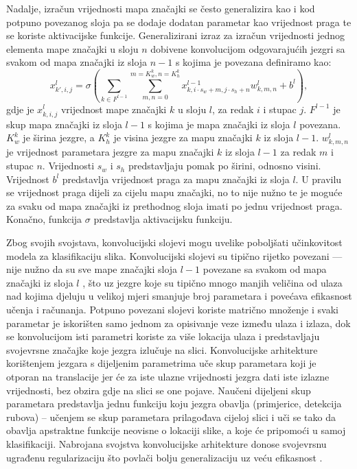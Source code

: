 \documentclass[times, utf8, diplomski, numeric]{fer}
\begin{document}
Nadalje, izračun vrijednosti mapa značajki se često generalizira kao i kod potpuno povezanog sloja pa se dodaje dodatan parametar kao vrijednost praga te se koriste aktivacijske funkcije.
Generalizirani izraz za izračun vrijednosti jednog elementa mape značajki u sloju $n$ dobivene konvolucijom odgovarajućih jezgri sa svakom od mapa značajki iz sloja $n-1$ s kojima je povezana definiramo kao:
\begin{equation}
 x^l_{k',i,j}=\sigma\left(\sum_{k\in F^{l-1}}\sum_{m,n=0}^{m=K_w^k,n=K_h^k}x^{l-1}_{k, i \cdot s_w +m, j \cdot s_h +n} w^l_{k, m, n} + b^l\right), \label{eq:generalized_convolution}
\end{equation}
gdje je $x_{k,i,j}^l$ vrijednost mape značajki $k$ u sloju $l$, za redak $i$ i stupac $j$. 
$F^{l-1}$ je skup mapa značajki iz sloja $l-1$ s kojima je mapa značajki iz sloja $l$ povezana. 
$K_w^k$ je širina jezgre, a $K_h^k$ je visina jezgre za mapu značajki $k$ iz sloja $l-1$. 
$w^l_{k, m, n}$ je vrijednost parametara jezgre za mapu značajki $k$ iz sloja $l-1$ za redak $m$ i stupac $n$.
Vrijednosti $s_w$ i $s_h$ predstavljaju pomak po širini, odnosno visini.
Vrijednost $b^l$ predstavlja vrijednost praga za mapu značajki iz sloja $l$. 
U pravilu se vrijednost praga dijeli za cijelu mapu značajki, no to nije nužno te je moguće za svaku od mapa značajki iz prethodnog sloja imati po jednu vrijednost praga.
Konačno, funkcija $\sigma$ predstavlja aktivacijsku funkciju.

Zbog svojih svojstava, konvolucijski slojevi mogu uvelike poboljšati učinkovitost modela za klasifikaciju slika.
Konvolucijski slojevi su tipično rijetko povezani --- nije nužno da su sve mape značajki sloja $l-1$ povezane sa svakom od mapa značajki iz sloja $l$ \citep{book:deeplearningbook}, što uz jezgre koje su tipično mnogo manjih veličina od ulaza nad kojima djeluju u velikoj mjeri smanjuje broj parametara i povećava efikasnost učenja i računanja.
Potpuno povezani slojevi koriste matrično množenje i svaki parametar je iskorišten samo jednom za opisivanje veze između ulaza i izlaza, dok se konvolucijom isti parametri koriste za više lokacija ulaza i predstavljaju svojevrsne značajke koje jezgra izlučuje na slici.
Konvolucijske arhitekture korištenjem jezgara s dijeljenim parametrima uče skup parametara koji je otporan na translacije jer će za iste ulazne vrijednosti jezgra dati iste izlazne vrijednosti, bez obzira gdje na slici se one pojave. 
Naučeni dijeljeni skup parametara predstavlja jednu funkciju koju jezgra obavlja (primjerice, detekcija rubova) -- učenjem se skup parametara prilagođava cijeloj slici i uči se tako da obavlja apstraktne funkcije neovisne o lokaciji slike, a koje će pripomoći u samoj klasifikaciji.
Nabrojana svojstva konvolucijske arhitekture donose svojevrsnu ugrađenu regularizaciju što povlači bolju generalizaciju uz veću efikasnost \citep{book:deeplearningbook} \citep{masters:vukotic_ms} \citep{seminar:rela}.
\end{document}
